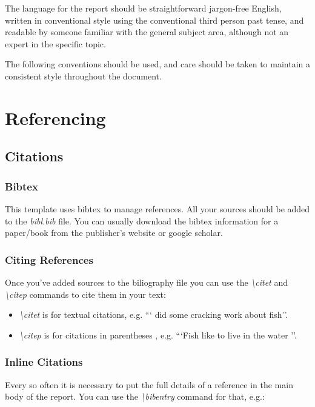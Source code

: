 \documentclass{BCUDissertation}
\begin{document}
\begin{appendices}
    The language for the report should be straightforward jargon-free English, written in conventional style using the conventional third person past tense, and readable by someone familiar with the general subject area, although not an expert in the specific topic.
        
    The following conventions should be used, and care should be taken to maintain a consistent style throughout the document.
 
\section{Referencing}
\label{sec:Referencing}
    \subsection{Citations}
    \label{sec:Citations}
    
        \subsubsection{Bibtex}
            This template uses bibtex to manage references. All your sources should be added to the \textit{bibl.bib} file. You can usually download the bibtex information for a paper/book from the publisher's website or google scholar.

        \subsubsection{Citing References}
            Once you've added sources to the biliography file you can use the \textit{\textbackslash citet} and \textit{\textbackslash citep} commands to cite them in your text:
        
            \begin{itemize}
                \item \textit{\textbackslash citet} is for textual citations, e.g. ```\citet{smith1999} did some cracking work about fish''.
                \item \textit{\textbackslash citep} is for citations in parentheses , e.g. ```Fish like to live in the water \citep{smith1999}''.
            \end{itemize}
    
        \subsubsection{Inline Citations}
            Every so often it is necessary to put the full details of a reference in the main body of the report. You can use the \textit{\textbackslash bibentry} command for that, e.g.:
        

\end{appendices}
\end{document}
